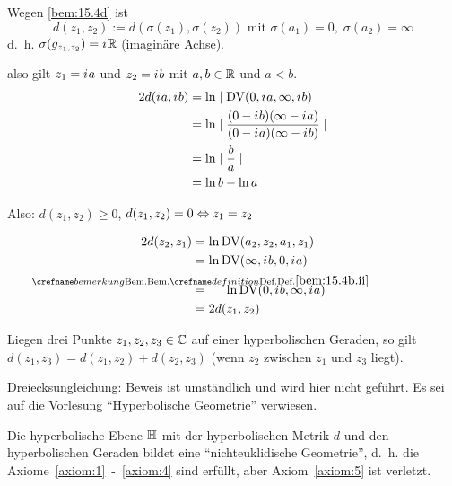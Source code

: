 \begin{beweis}
    Wegen \cref{bem:15.4d} ist
        \[d(z_1, z_2) := d(\sigma(z_1), \sigma(z_2)) \text{ mit } \sigma(a_1) = 0,\; \sigma(a_2) = \infty\]
    d.~h. $\sigma(g_{z_1, z_2}) = {i\mkern1mu} \mathbb{R}$ (imaginäre Achse).

    also gilt \obda $z_1 = {i\mkern1mu} a$ und $z_2 = {i\mkern1mu} b$ mit $a,b \in \mathbb{R}$ und $a < b$.
    \begin{align*}
        2d({i\mkern1mu} a, {i\mkern1mu} b)&= \ln \mid \operatorname{DV}(0, {i\mkern1mu} a, \infty, {i\mkern1mu} b) \mid \\
                        &= \ln \mid \frac{(0 - {i\mkern1mu} b) (\infty - {i\mkern1mu} a)}{(0 - {i\mkern1mu} a)(\infty - {i\mkern1mu} b)} \mid \\
                        &= \ln \mid \frac{b}{a} \mid\\
                        &= \ln b - \ln a
    \end{align*}

    Also: $d(z_1, z_2) \geq 0$, $d(z_1, z_2) = 0 \Leftrightarrow z_1 = z_2$

    \begin{align*}
        2 d(z_2, z_1) &= \ln \DV(a_2, z_2, a_1, z_1)\\
                      &= \ln \DV(\infty, \iu b, 0, \iu a)\\
            &\overset{\mathclap{\crefabbr{bem:15.4b.ii}}}{=}\hspace{5mm} \ln \DV(0, \iu b, \infty, \iu a)\\
                      &= 2 d(z_1, z_2)
    \end{align*}

    Liegen drei Punkte $z_1, z_2, z_3 \in \mathbb{C}$ auf einer hyperbolischen
    Geraden, so gilt $d(z_1, z_3) = d(z_1, z_2) + d(z_2, z_3)$
    (wenn $z_2$ zwischen $z_1$ und $z_3$ liegt).

    Dreiecksungleichung: Beweis ist umständlich und wird hier nicht geführt. Es sei auf die Vorlesung \enquote{Hyperbolische Geometrie}
    verwiesen.
\end{beweis}

\begin{satz}%
    Die hyperbolische Ebene $\mathbb{H}$ mit der hyperbolischen Metrik $d$
    und den hyperbolischen Geraden bildet eine \enquote{nichteuklidische Geometrie},
    d.~h. die Axiome~\ref{axiom:1}~-~\ref{axiom:4} sind erfüllt,
    aber Axiom~\ref{axiom:5} ist verletzt.
\end{satz}


